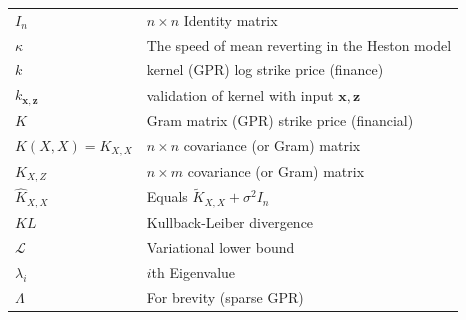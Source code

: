 \documentclass[12pt,a4paper,oneside]{book}
\begin{document}
\begin{tabular}{ll}
$I_n$ &  $n \times n$ Identity matrix  \\
$\kappa$ & The speed of mean reverting in the Heston model \\ 
$k$ &    kernel (GPR) log strike price (finance) \\
$k_{\bm{x},\bm{z}}$ &    validation of kernel with input $\bm{x} , \bm{z}$\\
$K$ &  Gram matrix (GPR) strike price (financial) \\
$K(X,X) = K_{X,X}$ & $n \times n$ covariance (or Gram) matrix   \\
$K_{X,Z}$& $n \times m$ covariance (or Gram) matrix   \\
$\hat{K}_{X,X}$ &  Equals $\tilde{K}_{X,X} + \sigma^2 I_n$ \\
$KL$& Kullback-Leiber divergence    \\
$\mathcal{L}$ & Variational lower bound   \\
$\lambda_i$ &  $i$th Eigenvalue  \\ 
$\Lambda$ & For brevity (sparse GPR) \\
\end{tabular}
\end{document}
